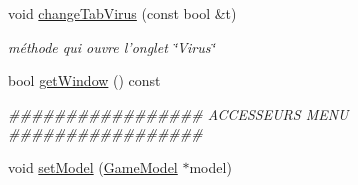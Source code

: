 \begin{DoxyCompactItemize}
void \hyperlink{classMenuView_a34b315b75c28860fa72a77bc201cc353}{changeTabVirus} (const bool \&t)
\begin{DoxyCompactList}\small\item\em méthode qui ouvre l'onglet \char`\"{}Virus\char`\"{} \end{DoxyCompactList}\item 
bool \hyperlink{classMenuView_a22d149bef690319035f9dd0bbff16b97}{getWindow} () const 
\begin{DoxyCompactList}\small\item\em \#\#\#\#\#\#\#\#\#\#\#\#\#\#\#\#\# ACCESSEURS MENU \#\#\#\#\#\#\#\#\#\#\#\#\#\#\#\#\# \end{DoxyCompactList}\item 
void \hyperlink{classMenuView_ad84172312bc686e5704e32ec6530bb73}{setModel} (\hyperlink{classGameModel}{GameModel} $\ast$model)
\end{DoxyCompactItemize}
